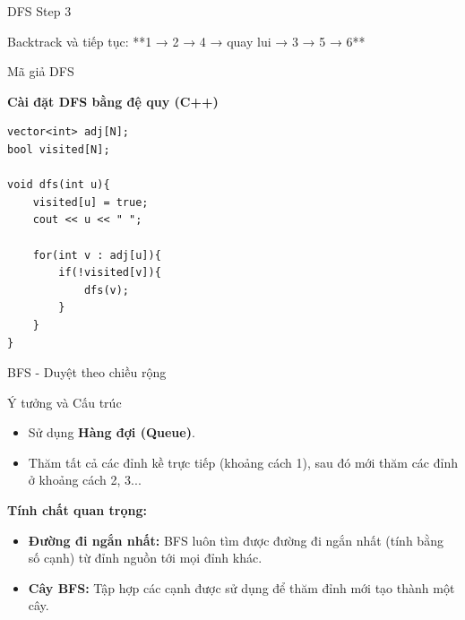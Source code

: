 \documentclass{beamer}
\begin{document}
\begin{frame}{DFS Step 3}

\centering


\vspace{0.5cm}

Backtrack và tiếp tục:  
**1 → 2 → 4 → quay lui → 3 → 5 → 6**

\end{frame}

\begin{frame}[fragile]{Mã giả DFS}

\textbf{Cài đặt DFS bằng đệ quy (C++)}

\begin{verbatim}
vector<int> adj[N];
bool visited[N];

void dfs(int u){
    visited[u] = true;
    cout << u << " ";

    for(int v : adj[u]){
        if(!visited[v]){
            dfs(v);
        }
    }
}
\end{verbatim}

\end{frame}

\begin{frame}{BFS - Duyệt theo chiều rộng}

\begin{block}{Ý tưởng và Cấu trúc}
\begin{itemize}
\item Sử dụng \textbf{Hàng đợi (Queue)}.
\item Thăm tất cả các đỉnh kề trực tiếp (khoảng cách 1), sau đó mới thăm các đỉnh ở khoảng cách 2, 3...
\end{itemize}
\end{block}

\pause
\textbf{Tính chất quan trọng:}
\begin{itemize}
\item \textbf{Đường đi ngắn nhất:} BFS luôn tìm được đường đi ngắn nhất (tính bằng số cạnh) từ đỉnh nguồn tới mọi đỉnh khác.
\item \textbf{Cây BFS:} Tập hợp các cạnh được sử dụng để thăm đỉnh mới tạo thành một cây.
\end{itemize}

\end{frame}
\end{document}
